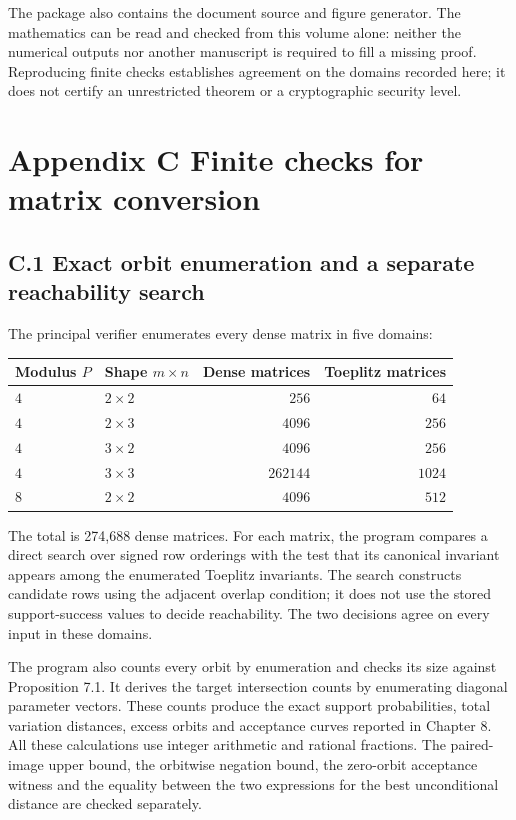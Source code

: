 \documentclass[
]{article}
\begin{document}
The package also contains the document source and figure generator. The
mathematics can be read and checked from this volume alone: neither the
numerical outputs nor another manuscript is required to fill a missing
proof. Reproducing finite checks establishes agreement on the domains
recorded here; it does not certify an unrestricted theorem or a
cryptographic security level.

\section{Appendix C Finite checks for matrix
conversion}\label{appendix-c-finite-checks-for-matrix-conversion}

\subsection{C.1 Exact orbit enumeration and a separate reachability
search}\label{c.1-exact-orbit-enumeration-and-a-separate-reachability-search}

The principal verifier enumerates every dense matrix in five domains:

\begin{longtable}[]{@{}llrr@{}}
\toprule\noalign{}
Modulus \(P\) & Shape \(m\times n\) & Dense matrices & Toeplitz
matrices \\
\midrule\noalign{}
\endhead
\bottomrule\noalign{}
\endlastfoot
\(4\) & \(2\times2\) & \(256\) & \(64\) \\
\(4\) & \(2\times3\) & \(4096\) & \(256\) \\
\(4\) & \(3\times2\) & \(4096\) & \(256\) \\
\(4\) & \(3\times3\) & \(262144\) & \(1024\) \\
\(8\) & \(2\times2\) & \(4096\) & \(512\) \\
\end{longtable}

The total is 274,688 dense matrices. For each matrix, the program
compares a direct search over signed row orderings with the test that
its canonical invariant appears among the enumerated Toeplitz
invariants. The search constructs candidate rows using the adjacent
overlap condition; it does not use the stored support-success values to
decide reachability. The two decisions agree on every input in these
domains.

The program also counts every orbit by enumeration and checks its size
against Proposition 7.1. It derives the target intersection counts by
enumerating diagonal parameter vectors. These counts produce the exact
support probabilities, total variation distances, excess orbits and
acceptance curves reported in Chapter 8. All these calculations use
integer arithmetic and rational fractions. The paired-image upper bound,
the orbitwise negation bound, the zero-orbit acceptance witness and the
equality between the two expressions for the best unconditional distance
are checked separately.
\end{document}
